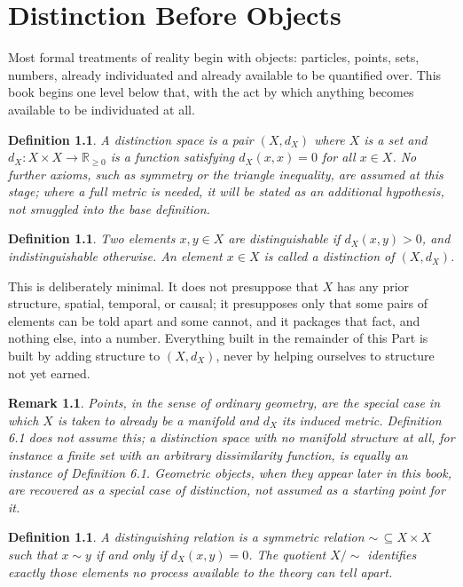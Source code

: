 \documentclass[11pt]{book}
\newtheorem{definition}[theorem]{Definition}
\newtheorem{remark}[theorem]{Remark}
\begin{document}
\chapter{Distinction Before Objects}

Most formal treatments of reality begin with objects: particles, points, sets, numbers, already individuated and already available to be quantified over. This book begins one level below that, with the act by which anything becomes available to be individuated at all.

\begin{definition}
A \emph{distinction space} is a pair $(X, d_X)$ where $X$ is a set and $d_X : X \times X \to \mathbb{R}_{\geq 0}$ is a function satisfying $d_X(x,x) = 0$ for all $x \in X$. No further axioms, such as symmetry or the triangle inequality, are assumed at this stage; where a full metric is needed, it will be stated as an additional hypothesis, not smuggled into the base definition.
\end{definition}

\begin{definition}
Two elements $x, y \in X$ are \emph{distinguishable} if $d_X(x,y) > 0$, and \emph{indistinguishable} otherwise. An element $x \in X$ is called a \emph{distinction} of $(X, d_X)$.
\end{definition}

This is deliberately minimal. It does not presuppose that $X$ has any prior structure, spatial, temporal, or causal; it presupposes only that some pairs of elements can be told apart and some cannot, and it packages that fact, and nothing else, into a number. Everything built in the remainder of this Part is built by adding structure to $(X, d_X)$, never by helping ourselves to structure not yet earned.

\begin{remark}
Points, in the sense of ordinary geometry, are the special case in which $X$ is taken to already be a manifold and $d_X$ its induced metric. Definition 6.1 does not assume this; a distinction space with no manifold structure at all, for instance a finite set with an arbitrary dissimilarity function, is equally an instance of Definition 6.1. Geometric objects, when they appear later in this book, are recovered as a special case of distinction, not assumed as a starting point for it.
\end{remark}

\begin{definition}
A \emph{distinguishing relation} is a symmetric relation $\sim \, \subseteq X \times X$ such that $x \sim y$ if and only if $d_X(x,y) = 0$. The quotient $X / \! \sim$ identifies exactly those elements no process available to the theory can tell apart.
\end{definition}
\end{document}
